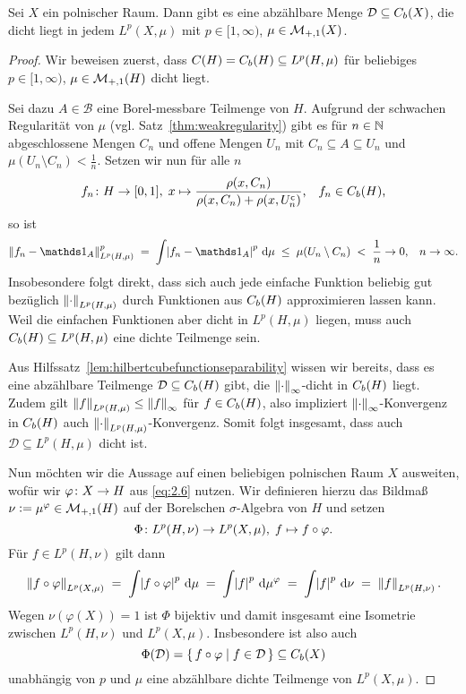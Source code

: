 \documentclass[../main/main.tex]{subfiles}
\begin{document}
	\begin{Satz}
		\label{thm:Lp}
		Sei $X$ ein polnischer Raum. Dann gibt es eine abzählbare Menge 
		$\mathcal{D} \subseteq C_b(X)$, die dicht liegt in jedem 
		$L^p(X, \mu)$ mit $p \in [1, \infty)$, $\mu \in \mathcal{M}_{+,1}(X)$.
	\end{Satz}
	
	\begin{proof}
		Wir beweisen zuerst, dass $C(H) = C_b(H) \subseteq L^p(H, \mu)$ für beliebiges 
		$p \in [1, \infty)$, $\mu \in \mathcal{M}_{+,1}(H)$ dicht liegt. 
		
		Sei dazu $A \in \mathcal{B}$ eine Borel-messbare Teilmenge von $H$. 
		Aufgrund der schwachen Regularität von $\mu$ (vgl. Satz~\ref{thm:weakregularity}) 
		gibt es für $n \in \mathbb{N}$ abgeschlossene Mengen $C_n$ und offene Mengen 
		$U_n$ mit $C_n \subseteq A \subseteq U_n$ und 
		$\mu(U_n \setminus C_n) < \frac{1}{n}$. Setzen wir nun für alle $n$
		\[f_n \colon H \to [0, 1], \; x \mapsto \frac{\rho(x, C_n)}{\rho(x, C_n) + 
				\rho(x, U_n^\mathsf{c})}  \text{,} \quad f_n \in C_b(H) \text{,}\]
		so ist
		\[ \norm{f_n - \indfct_A}_{L^p(H, \mu)}^p \; = \; 
		\measureint{}{\abs{f_n - \indfct_A}^p}{\mu} \; \leq \; 
		\mu(U_n \setminus C_n) \; < \; \frac{1}{n} \to 0 \text{,} 
		\quad n \to \infty \text{.}\]
		Insobesondere folgt direkt, dass sich auch jede einfache Funktion 
		beliebig gut bezüglich $\left\lVert\cdot\right\rVert_{L^p(H, \mu)}$ durch Funktionen aus $C_b(H)$ 
		approximieren lassen kann. Weil die einfachen Funktionen aber dicht 
		in $L^p(H, \mu)$ liegen, muss auch $C_b(H) \subseteq L^p(H, \mu)$ eine 
		dichte Teilmenge sein.
		
		Aus Hilfssatz~\ref{lem:hilbertcubefunctionseparability} wissen wir 
		bereits, dass es eine abzählbare Teilmenge $\mathcal{D}\subseteq C_b(H)$ 
		gibt, die $\left\lVert\cdot\right\rVert_\infty$-dicht in $C_b(H)$ liegt. Zudem gilt 
		$\left\lVert f\right\rVert_{L^p(H, \mu)} \leq \left\lVert f\right\rVert_\infty$ für $f \in C_b(H)$, also impliziert 
		$\left\lVert\cdot\right\rVert_\infty$-Konvergenz in $C_b(H)$ auch $\left\lVert\cdot\right\rVert_{L^p(H, \mu)}$-Konvergenz. 
		Somit folgt insgesamt, dass auch $\mathcal{D} \subseteq L^p(H, \mu)$ dicht ist.
		
		Nun möchten wir die Aussage auf einen beliebigen polnischen Raum $X$ ausweiten, 
		wofür wir $\varphi \colon X \to H$ aus \eqref{eq:2.6} nutzen.
		Wir definieren hierzu das Bildmaß $\nu \vcentcolon = \mu^\varphi \in \mathcal{M}_{+,1}(H)$ 
		auf der Borelschen $\sigma$-Algebra von $H$ und setzen
		\[\Phi \colon L^p(H, \nu) \to L^p(X, \mu), \; f \mapsto f \circ \varphi  \text{.}\]
		Für $f \in L^p(H, \nu)$ gilt dann
		\[ \left\lVert f \circ \varphi\right\rVert_{L^p(X, \mu)} 
		\; = \; \int_{} \, \left| f \circ \varphi \right|^p \, \mathrm{d}\mu 
		\; = \; \int_{} \, \left| f \right|^p \, \mathrm{d}\mu^\varphi 
		\; = \; \int_{} \, \left| f \right|^p \, \mathrm{d}\nu 
		\; = \; \left\lVert f\right\rVert_{L^p(H, \nu)} \text{.} \]
		Wegen $\nu(\varphi(X)) = 1$ ist $\Phi$ bijektiv und damit insgesamt eine Isometrie 
		zwischen $L^p(H, \nu)$ und $L^p(X, \mu)$. Insbesondere ist also auch 
		\[\Phi(\mathcal{D}) = \left\{\, f \circ \varphi \; \middle| \; f \in \mathcal{D} \,\right\} \subseteq C_b(X)\]
		unabhängig von $p$ und $\mu$ eine abzählbare dichte Teilmenge von $L^p(X, \mu)$.
	\end{proof}
\end{document}
